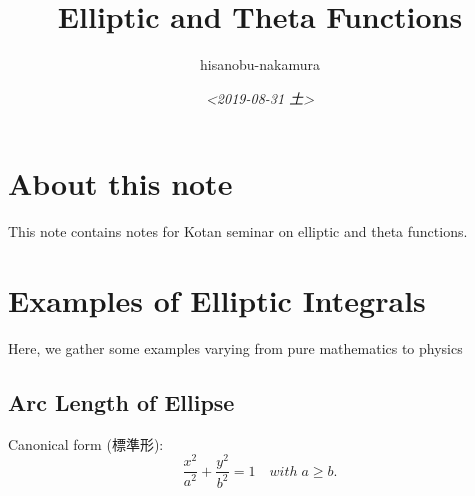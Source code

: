 \documentclass{article}
\author{hisanobu-nakamura}
\date{\textit{<2019-08-31 土>}}
\title{Elliptic and Theta Functions}
\begin{document}
\maketitle
\tableofcontents


\section{About this note}
\label{sec-1}
This note contains notes for Kotan seminar on elliptic and theta functions.

\section{Examples of Elliptic Integrals}
\label{sec-2}
Here, we gather some examples varying from pure mathematics to physics
\subsection{Arc Length of Ellipse}
\label{sec-2-1}
Canonical form (標準形):
\begin{equation}
\frac{x^{2}}{a^{2}} +\frac{y^{2}}{b^{2}}=1 \quad with \; a \ge b.
\end{equation}
\end{document}
